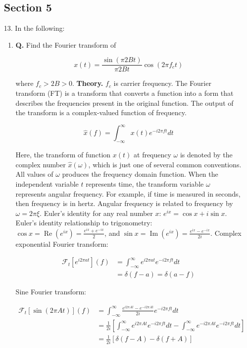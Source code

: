 \documentclass[main.tex]{subfiles}
\begin{document}
\begin{enumerate}

\subsection*{Section 5} 

\item [13.] In the following:

    \begin{enumerate}
        \item \textbf{Q.} Find the Fourier transform of 
        
        $$
        x(t)=\frac{\sin (\pi 2 B t)}{\pi 2 B t} \cos \left(2 \pi f_{c} t\right)
        $$
        
        where $f_{c}>2 B>0$. \textbf{Theory.} $f_c$ is carrier frequency. The Fourier transform (FT) is a transform that converts a function into a form that describes the frequencies present in the original function. The output of the transform is a complex-valued function of frequency. 

        $$
        \hat{x}(f)=\int_{-\infty}^{\infty} x(t) e^{-i 2 \pi f t} dt
        $$

        Here, the transform of function $x(t)$ at frequency $\omega$ is denoted by the complex number $\hat{x}(\omega)$, which is just one of several common conventions. All values of $\omega$ produces the frequency domain function. When the independent variable $t$ represents time, the transform variable $\omega$ represents angular frequency. For example, if time is measured in seconds, then frequency is in hertz. Angular frequency is related to frequency by $\omega=2 \pi \xi$. Euler's identity for any real number $x$: $e^{i x}=\cos x+i \sin x$. Euler's identity relationship to trigonometry: $\cos x=\operatorname{Re}\left(e^{i x}\right)=\frac{e^{i x}+e^{-i x}}{2}$, and $\sin x=\operatorname{Im}\left(e^{i x}\right)=\frac{e^{i x}-e^{-i x}}{2 i}$. Complex exponential Fourier transform: 

        $$
        \begin{aligned}
        \mathcal{F}_t [e^{i 2 \pi a t}](f) &= \int_{-\infty}^{\infty} e^{i 2 \pi a t} e^{-i 2 \pi f t} dt \\
        &= \delta(f-a)=\delta(a-f)
        \end{aligned}
        $$

        Sine Fourier transform:

        $$
        \begin{aligned}
        \mathcal{F}_t [\sin (2 \pi A t)](f) &= \int_{-\infty}^{\infty} \frac{e^{i 2 \pi A t}-e^{-i 2 \pi A t}}{2i} e^{-i 2 \pi f t} d t \\
        & =\frac{1}{2i}\left[\int_{-\infty}^{\infty} e^{i 2 \pi A t} e^{-i 2 \pi f t} d t-\int_{-\infty}^{\infty} e^{-i 2 \pi A t} e^{-i 2 \pi f t} dt\right] \\
        &=\frac{1}{2 i}[\delta(f-A)-\delta(f+A)]
        \end{aligned}
        $$


\end{enumerate}
\end{enumerate}
\end{document}
